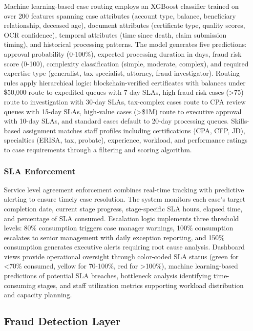 Machine learning-based case routing employs an XGBoost classifier trained on over 200 features spanning case attributes (account type, balance, beneficiary relationship, deceased age), document attributes (certificate type, quality scores, OCR confidence), temporal attributes (time since death, claim submission timing), and historical processing patterns. The model generates five predictions: approval probability (0-100\%), expected processing duration in days, fraud risk score (0-100), complexity classification (simple, moderate, complex), and required expertise type (generalist, tax specialist, attorney, fraud investigator). Routing rules apply hierarchical logic: blockchain-verified certificates with balances under \$50,000 route to expedited queues with 7-day SLAs, high fraud risk cases (>75) route to investigation with 30-day SLAs, tax-complex cases route to CPA review queues with 15-day SLAs, high-value cases (>\$1M) route to executive approval with 10-day SLAs, and standard cases default to 20-day processing queues. Skills-based assignment matches staff profiles including certifications (CPA, CFP, JD), specialties (ERISA, tax, probate), experience, workload, and performance ratings to case requirements through a filtering and scoring algorithm.

\subsubsection{SLA Enforcement}

Service level agreement enforcement combines real-time tracking with predictive alerting to ensure timely case resolution. The system monitors each case's target completion date, current stage progress, stage-specific SLA hours, elapsed time, and percentage of SLA consumed. Escalation logic implements three threshold levels: 80\% consumption triggers case manager warnings, 100\% consumption escalates to senior management with daily exception reporting, and 150\% consumption generates executive alerts requiring root cause analysis. Dashboard views provide operational oversight through color-coded SLA status (green for <70\% consumed, yellow for 70-100\%, red for >100\%), machine learning-based predictions of potential SLA breaches, bottleneck analysis identifying time-consuming stages, and staff utilization metrics supporting workload distribution and capacity planning.

\subsection{Fraud Detection Layer}

